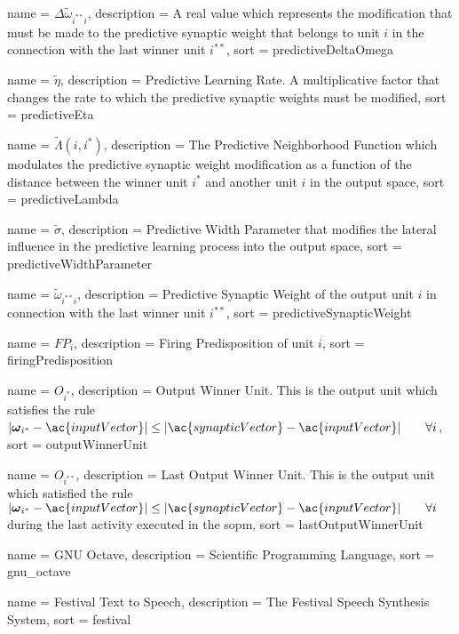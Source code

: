 {
  name = {\ensuremath{\Delta \tilde{\omega}_{i^{**}i}}},
  description = {A real value which represents the modification that must be made to the predictive synaptic weight that belongs to unit $i$ in the connection with the last winner unit $i^{**}$},
  sort  = predictiveDeltaOmega
}

{
  name = {\ensuremath{\tilde{\eta}}},
  description = {Predictive Learning Rate. A multiplicative factor that changes the rate to which the predictive synaptic weights must be modified},
  sort  = predictiveEta
}

{
  name = {\ensuremath{\tilde{\Lambda}(i,i^*)}},
  description = {The Predictive Neighborhood Function which modulates the predictive synaptic weight modification as a function of the distance between the winner unit $i^*$ and another unit $i$ in the output space},
  sort  = predictiveLambda
}

{
  name = {\ensuremath{\tilde{\sigma}}},
  description = {Predictive Width Parameter that modifies the lateral influence in the predictive learning process into the output space},
  sort  = predictiveWidthParameter
}

{
  name = {\ensuremath{\tilde{\omega}_{i^{**}i}}},
  description = {Predictive Synaptic Weight of the output unit $i$ in connection with the last winner unit $i^{**}$},
  sort  = predictiveSynapticWeight
}

{
  name = {\ensuremath{FP_i}},
  description = {Firing Predisposition of unit $i$},
  sort  = firingPredisposition
}

{
  name = {\ensuremath{O_{i^*}}},
  description = {Output Winner Unit. This is the output unit which satisfies the rule $|\boldsymbol{\omega}_{i^*} - \ac{inputVector}| \leq |\ac{synapticVector} - \ac{inputVector}| \quad \quad \forall i$},
  sort  = outputWinnerUnit
}

{
  name = {\ensuremath{O_{i^{**}}}},
  description = {Last Output Winner Unit. This is the output unit which satisfied the rule $|\boldsymbol{\omega}_{i^*} - \ac{inputVector}| \leq |\ac{synapticVector} - \ac{inputVector}| \quad \quad \forall i$ during the last activity executed in the \ac{sopm}},
  sort  = lastOutputWinnerUnit
}

{
  name = {GNU Octave},
  description = {Scientific Programming Language},
  sort  = gnu_octave
}

{
  name = {Festival Text to Speech},
  description = {The Festival Speech Synthesis System},
  sort  = festival
}


